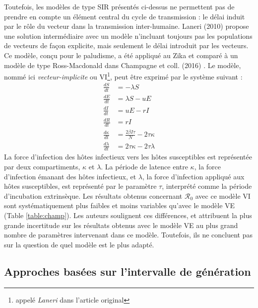 Toutefois, les modèles de type SIR présentés ci-dessus ne permettent pas de prendre en compte un élément central du cycle de transmission : le délai induit par le rôle du vecteur dans la transmission inter-humaine.
Laneri (2010) \cite{laneri2010forcing} propose une solution intermédiaire avec un modèle n'incluant toujours pas les populations de vecteurs de façon explicite, mais seulement le délai introduit par les vecteurs.
Ce modèle, conçu pour le paludisme, a été appliqué au Zika et comparé à un modèle de type Ross-Macdonald dans Champagne et coll. (2016) \cite{Champagne064949}.
Le modèle, nommé ici {\em vecteur-implicite} ou VI\footnote{appelé {\em Laneri} dans l'article original}, peut être exprimé par le système suivant :
\begin{align}
\label{eq:champvi}
\frac{dS}{dt} &= -\lambda S \\ 
\frac{dE}{dt} &= \lambda S - uE \\ 
\frac{dI}{dt} &= uE - rI \\ 
\frac{dR}{dt} &= rI \\  
\frac{d\kappa}{dt} &= \frac{2\beta I \tau}{N} - 2 \tau \kappa\\ 
\frac{d\lambda}{dt} &= 2 \tau \kappa - 2 \tau \lambda
\end{align}
La force d'infection des hôtes infectieux vers les hôtes susceptibles est représentée par deux compartiments, $\kappa$ et $\lambda$.
La période de latence entre $\kappa$, la force d'infection émanant des hôtes infectieux, et $\lambda$, la force d'infection appliqué aux hôtes susceptibles, est représenté par le paramètre $\tau$, interprété comme la période d'incubation extrinsèque.
Les résultats obtenus concernant $\mathcal{R}_0$ avec ce modèle VI sont systématiquement plus faibles et moins variables qu'avec le modèle VE (Table \ref{table:champ}).
Les auteurs soulignent ces différences, et attribuent la plus grande incertitude sur les résultats obtenus avec le modèle VE au plus grand nombre de paramètres intervenant dans ce modèle.
Toutefois, ils ne concluent pas sur la question de quel modèle est le plus adapté.

\subsection{Approches basées sur l'intervalle de génération}
\label{sec:ig}

